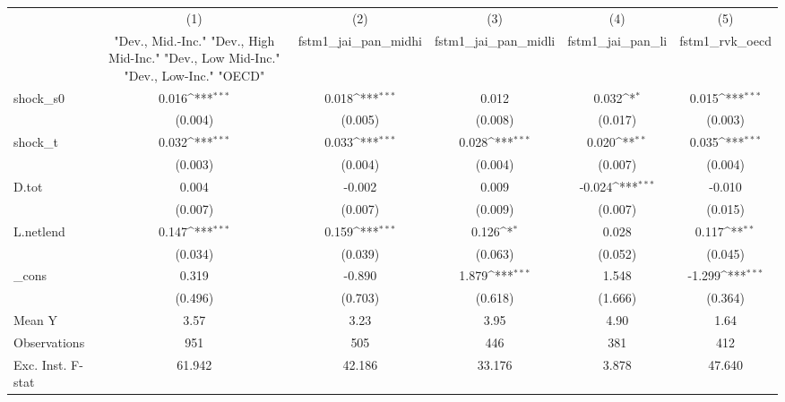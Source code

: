 {
\def\sym#1{\ifmmode^{#1}\else\(^{#1}\)\fi}
\begin{tabular}{l*{5}{c}}
\toprule
            &\multicolumn{1}{c}{(1)}&\multicolumn{1}{c}{(2)}&\multicolumn{1}{c}{(3)}&\multicolumn{1}{c}{(4)}&\multicolumn{1}{c}{(5)}\\
            &\multicolumn{1}{c}{ "Dev., Mid.-Inc." "Dev., High Mid-Inc." "Dev., Low Mid-Inc." "Dev., Low-Inc." "OECD" }&\multicolumn{1}{c}{fstm1\_jai\_pan\_midhi}&\multicolumn{1}{c}{fstm1\_jai\_pan\_midli}&\multicolumn{1}{c}{fstm1\_jai\_pan\_li}&\multicolumn{1}{c}{fstm1\_rvk\_oecd}\\
\midrule
shock\_s0    &       0.016\sym{***}&       0.018\sym{***}&       0.012         &       0.032\sym{*}  &       0.015\sym{***}\\
            &     (0.004)         &     (0.005)         &     (0.008)         &     (0.017)         &     (0.003)         \\
\addlinespace
shock\_t     &       0.032\sym{***}&       0.033\sym{***}&       0.028\sym{***}&       0.020\sym{**} &       0.035\sym{***}\\
            &     (0.003)         &     (0.004)         &     (0.004)         &     (0.007)         &     (0.004)         \\
\addlinespace
D.tot       &       0.004         &      -0.002         &       0.009         &      -0.024\sym{***}&      -0.010         \\
            &     (0.007)         &     (0.007)         &     (0.009)         &     (0.007)         &     (0.015)         \\
\addlinespace
L.netlend   &       0.147\sym{***}&       0.159\sym{***}&       0.126\sym{*}  &       0.028         &       0.117\sym{**} \\
            &     (0.034)         &     (0.039)         &     (0.063)         &     (0.052)         &     (0.045)         \\
\addlinespace
\_cons      &       0.319         &      -0.890         &       1.879\sym{***}&       1.548         &      -1.299\sym{***}\\
            &     (0.496)         &     (0.703)         &     (0.618)         &     (1.666)         &     (0.364)         \\
\midrule
Mean Y      &        3.57         &        3.23         &        3.95         &        4.90         &        1.64         \\
Observations&         951         &         505         &         446         &         381         &         412         \\
Exc. Inst. F-stat&      61.942         &      42.186         &      33.176         &       3.878         &      47.640         \\
\bottomrule
\end{tabular}
}
